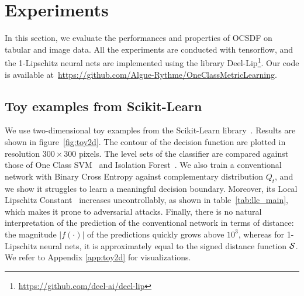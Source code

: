 

\section{Experiments}

In this section, we evaluate the performances and properties of OCSDF on tabular and image data. All the experiments are conducted with tensorflow, and the 1-Lipschitz neural nets are implemented using the library Deel-Lip\footnote{\url{https://github.com/deel-ai/deel-lip}}. Our code is available at~\url{https://github.com/Algue-Rythme/OneClassMetricLearning}.
\subsection{Toy examples from Scikit-Learn}

We use two-dimensional toy examples from the Scikit-Learn library~\cite{pedregosa2011scikit}. Results are shown in figure~\ref{fig:toy2d}. The contour of the decision function are plotted in resolution $300\times 300$ pixels. The level sets of the classifier are compared against those of One Class SVM~\cite{scholkopf2001estimating} and Isolation Forest~\cite{liu2008isolation}. We also train a conventional network with Binary Cross Entropy against complementary distribution $Q_t$, and we show it struggles to learn a meaningful decision boundary. Moreover, its Local Lipschitz Constant~\cite{jordan2020exactly} increases uncontrollably, as shown in table~\ref{tab:llc_main}, which makes it prone to adversarial attacks. Finally, there is no natural interpretation of the prediction of the conventional network in terms of distance: the magnitude $|f(\cdot)|$ of the predictions quickly grows above $10^3$, whereas for 1-Lipschitz neural nets, it is approximately equal to the signed distance function $\mathcal{S}$. We refer to Appendix \ref{app:toy2d} for visualizations.


